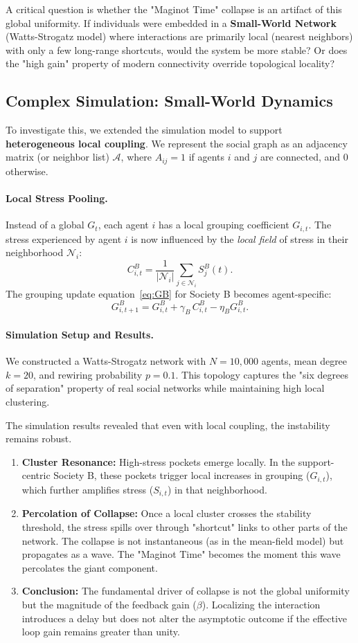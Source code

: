 \documentclass[11pt]{article}
\theoremstyle{plain}
\begin{document}
A critical question is whether the "Maginot Time" collapse is an artifact of this global uniformity. If individuals were embedded in a \textbf{Small-World Network} (Watts-Strogatz model) where interactions are primarily local (nearest neighbors) with only a few long-range shortcuts, would the system be more stable? Or does the "high gain" property of modern connectivity override topological locality?

\subsection{Complex Simulation: Small-World Dynamics}
To investigate this, we extended the simulation model to support \textbf{heterogeneous local coupling}.
We represent the social graph as an adjacency matrix (or neighbor list) $\mathcal{A}$, where $A_{ij}=1$ if agents $i$ and $j$ are connected, and $0$ otherwise.

\paragraph{Local Stress Pooling.}
Instead of a global $G_t$, each agent $i$ has a local grouping coefficient $G_{i,t}$. The stress experienced by agent $i$ is now influenced by the \emph{local field} of stress in their neighborhood $\mathcal{N}_i$:
\[
C_{i,t}^B = \frac{1}{|\mathcal{N}_i|} \sum_{j \in \mathcal{N}_i} S_j^B(t).
\]
The grouping update equation~\eqref{eq:GB} for Society B becomes agent-specific:
\[
G_{i,t+1}^B = G_{i,t}^B + \gamma_B\, C_{i,t}^B - \eta_B G_{i,t}^B.
\]

\paragraph{Simulation Setup and Results.}
We constructed a Watts-Strogatz network with $N=10,000$ agents, mean degree $k=20$, and rewiring probability $p=0.1$. This topology captures the "six degrees of separation" property of real social networks while maintaining high local clustering.

The simulation results revealed that even with local coupling, the instability remains robust.
\begin{enumerate}
    \item \textbf{Cluster Resonance:} High-stress pockets emerge locally. In the support-centric Society B, these pockets trigger local increases in grouping ($G_{i,t}$), which further amplifies stress ($S_{i,t}$) in that neighborhood.
    \item \textbf{Percolation of Collapse:} Once a local cluster crosses the stability threshold, the stress spills over through "shortcut" links to other parts of the network. The collapse is not instantaneous (as in the mean-field model) but propagates as a wave. The "Maginot Time" becomes the moment this wave percolates the giant component.
    \item \textbf{Conclusion:} The fundamental driver of collapse is not the global uniformity but the magnitude of the feedback gain ($\beta$). Localizing the interaction introduces a delay but does not alter the asymptotic outcome if the effective loop gain remains greater than unity.
\end{enumerate}
\end{document}
